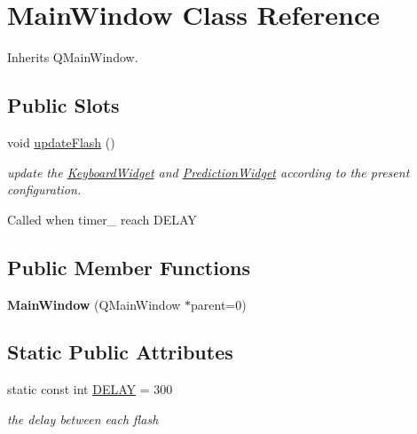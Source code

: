 \hypertarget{class_main_window}{\section{Main\-Window Class Reference}
\label{class_main_window}
}


Inherits Q\-Main\-Window.

\subsection*{Public Slots}
\begin{DoxyCompactItemize}
\item 
\hypertarget{class_main_window_a2c60fa94bf903a2fd73fd5ab9c743d61}{void \hyperlink{class_main_window_a2c60fa94bf903a2fd73fd5ab9c743d61}{update\-Flash} ()}\label{class_main_window_a2c60fa94bf903a2fd73fd5ab9c743d61}

\begin{DoxyCompactList}\small\item\em update the \hyperlink{class_keyboard_widget}{Keyboard\-Widget} and \hyperlink{class_prediction_widget}{Prediction\-Widget} according to the present configuration. \par
 Called when timer\-\_\- reach D\-E\-L\-A\-Y \end{DoxyCompactList}\end{DoxyCompactItemize}
\subsection*{Public Member Functions}
\begin{DoxyCompactItemize}
\item 
\hypertarget{class_main_window_ab7d94977fe4f15c9850f3e4928e02672}{{\bfseries Main\-Window} (Q\-Main\-Window $\ast$parent=0)}\label{class_main_window_ab7d94977fe4f15c9850f3e4928e02672}

\end{DoxyCompactItemize}
\subsection*{Static Public Attributes}
\begin{DoxyCompactItemize}
\item 
\hypertarget{class_main_window_a19ab095b0f58e8746bfa538ef43b23b4}{static const int \hyperlink{class_main_window_a19ab095b0f58e8746bfa538ef43b23b4}{D\-E\-L\-A\-Y} = 300}\label{class_main_window_a19ab095b0f58e8746bfa538ef43b23b4}

\begin{DoxyCompactList}\small\item\em the delay between each flash \end{DoxyCompactList}\end{DoxyCompactItemize}


